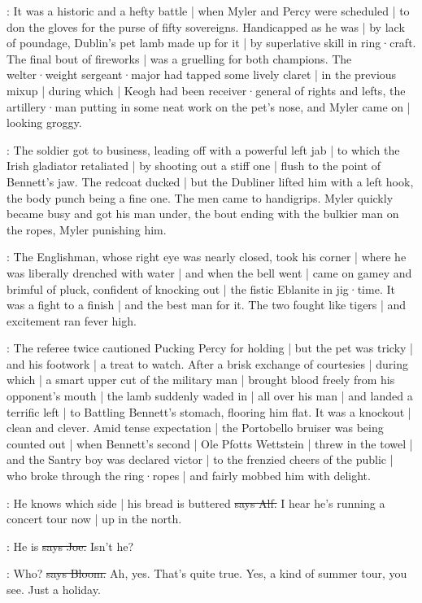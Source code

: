 :
It was a historic and a hefty battle
 |
when Myler and Percy were scheduled |
to don the gloves for the purse of fifty sovereigns.
Handicapped as he was |
by lack of poundage,
Dublin's pet lamb made up for it |
by superlative skill in ring·craft.
The final bout of fireworks |
was a gruelling for both champions.
The welter·weight sergeant·major had tapped some lively claret |
in the previous mixup |
during which |
Keogh had been receiver·general of rights and lefts,
the artillery·man putting in some neat work on the pet's nose,
and Myler came on |
looking groggy.

:
The soldier got to business,
leading off with a powerful left jab |
to which the Irish gladiator retaliated |
by shooting out a stiff one |
flush to the point of Bennett's jaw.
The redcoat ducked |
but the Dubliner lifted him with a left hook,
the body punch being a fine one.
The men came to handigrips.
Myler quickly became busy and got his man under,
the bout ending with the bulkier man on the ropes,
Myler punishing him.

:
The Englishman,
whose right eye was nearly closed,
took his corner |
where he was liberally drenched with water |
and when the bell went |
came on gamey and brimful of pluck,
confident of knocking out |
the fistic Eblanite in jig·time.
It was a fight to a finish |
and the best man for it.
The two fought like tigers |
and excitement ran fever high.

:
The referee twice cautioned Pucking Percy for holding |
but the pet was tricky |
and his footwork |
a treat to watch.
After a brisk exchange of courtesies |
during which |
a smart upper cut of the military man
 |
brought blood freely from his opponent's mouth |
the lamb suddenly waded in |
all over his man |
and landed a terrific left |
to Battling Bennett's stomach,
flooring him flat.
It was a knockout |
clean and clever.
Amid tense expectation |
the Portobello bruiser was being counted out |
when Bennett's second |
Ole Pfotts Wettstein |
threw in the towel |
and the Santry boy was declared victor |
to the frenzied cheers of the public |
who broke through the ring·ropes |
and fairly mobbed him with delight.

\bergan:
He knows which side |
his bread is buttered
\sout{says Alf.}
I hear he's running a concert tour now |
up in the north.

\joe:
He is
\sout{says Joe.}
Isn't he?

\Bloom:
Who?
\sout{says Bloom.}
Ah,
yes.
That's quite true.
Yes,
a kind of summer tour,
you see.
Just a holiday.


